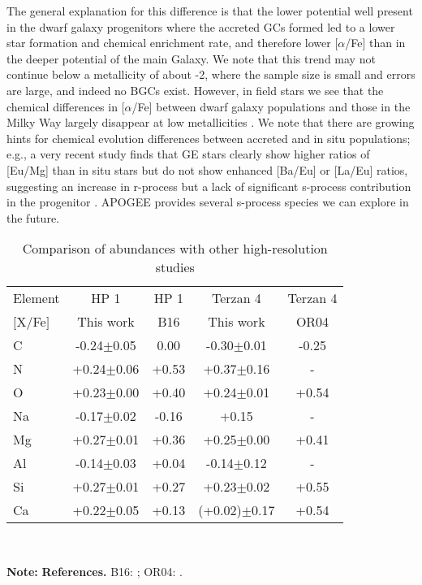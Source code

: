 \documentclass[onecolumn]{aa}
\begin{document}
The general explanation for this difference is that the lower potential well present in the dwarf galaxy progenitors where the accreted GCs formed led to a lower star formation and chemical enrichment rate, and therefore lower [$\alpha$/Fe] than in the deeper potential of the main Galaxy. We note that this trend may not continue below a metallicity of about -2, where the sample size is small and errors are large, and indeed no BGCs exist. However, in field stars we see that the chemical differences in [$\alpha$/Fe] between dwarf galaxy populations and those in the Milky Way largely disappear at low metallicities \citep[e.g.,][]{Tolstoy2009}.
We note that there are growing hints for chemical evolution differences between accreted and in situ populations; e.g., a very recent study finds that GE stars clearly show higher ratios of [Eu/Mg] than in situ stars but
do not show enhanced [Ba/Eu] or [La/Eu] ratios, suggesting an increase in r-process but a lack of significant s-process contribution in the progenitor \citep{Matsuno2021}. APOGEE provides several s-process species we can explore in the future.



\begin{table*}
	\begin{center}
		\setlength{\tabcolsep}{2.mm}  
		\caption{Comparison of abundances with other high-resolution studies}
		\begin{tabular}{l c c c c  }
			\hline
Element    &     HP 1           &    HP 1     &      Terzan 4       &  Terzan 4\\
$ [$X/Fe$] $&   This work        &    B16      &    This work       &   OR04\\
\hline
C          &   -0.24$\pm$0.05   &    0.00     &   -0.30$\pm$0.01   &  -0.25\\
N          &   +0.24$\pm$0.06    &    +0.53     &   +0.37$\pm$0.16   &   -\\
O          &   +0.23$\pm$0.00    &    +0.40     &    +0.24$\pm$0.01   &  +0.54\\
Na         &   -0.17$\pm$0.02   &    -0.16    &    +0.15  &  -\\
Mg         &   +0.27$\pm$0.01    &    +0.36     &    +0.25$\pm$0.00   &  +0.41\\
Al         &   -0.14$\pm$0.03    &    +0.04     &    -0.14$\pm$0.12   &  -\\
Si         &   +0.27$\pm$0.01    &    +0.27     &    +0.23$\pm$0.02   &  +0.55\\
Ca         &   +0.22$\pm$0.05    &    +0.13     &    (+0.02)$\pm$0.17   &  +0.54\\
			\hline
		\end{tabular}  \label{comparison}\\
	\end{center}
	\raggedright{{\bf Note:} \textbf{References.} B16: \citet{Barbuy2016}; 
		OR04: \citet{Origlia2004}.}
\end{table*}
\end{document}

